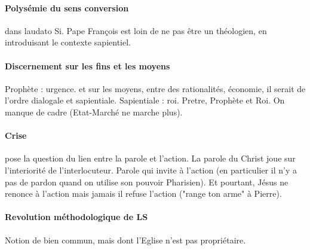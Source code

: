 \paragraph{Polysémie du sens conversion} dans laudato Si. Pape François est loin de ne pas être un théologien, en introduisant le contexte sapientiel.

\paragraph{Discernement sur les fins et les moyens} Prophète : urgence. et sur les moyens, entre des rationalités, économie, il serait de l'ordre dialogale et sapientiale. Sapientiale : roi. Pretre, Prophète et Roi. 
On manque de cadre (Etat-Marché ne marche plus). 

\paragraph{Crise} pose la question du lien entre la parole et l'action. La parole du Christ joue sur l'interiorité de l'interlocuteur. Parole qui invite à l'action (en particulier il n'y a pas de pardon quand on utilise son pouvoir Pharisien). Et pourtant, Jésus ne renonce à l'action mais jamais il refuse l'action ("range ton arme" à Pierre). 

\paragraph{Revolution méthodologique de LS} Notion de bien commun, mais dont l'Eglise n'est pas propriétaire. 
